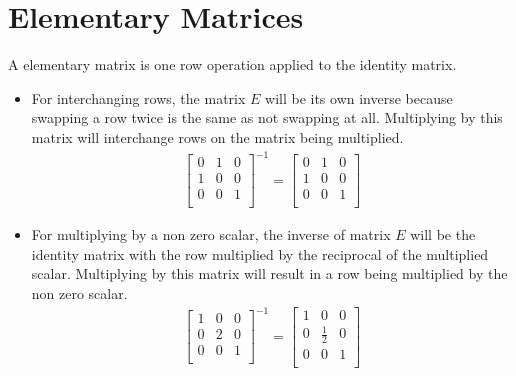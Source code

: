 \documentclass{article}
\theoremstyle{mytheoremstyle}
\theoremstyle{mytheoremstyle}
\theoremstyle{myproblemstyle}
\begin{document}
    \section*{Elementary Matrices}
    A elementary matrix is one row operation applied to the identity matrix.
    \begin{itemize}
        \item For interchanging rows, the matrix $E$ will be its own inverse
            because swapping a row twice is the same as not swapping at all.
            Multiplying by this matrix will interchange rows on the matrix being
            multiplied.
            \begin{align*}
                \begin{bmatrix}
                    0 & 1 & 0 \\
                    1 & 0 & 0 \\
                    0 & 0 & 1 \\
                \end{bmatrix}^{-1} = 
                \begin{bmatrix}
                    0 & 1 & 0 \\
                    1 & 0 & 0 \\
                    0 & 0 & 1 \\
                \end{bmatrix}
            \end{align*}

        \item For multiplying by a non zero scalar, the inverse of matrix $E$
            will be the identity matrix with the row multiplied by the
            reciprocal of the multiplied scalar. Multiplying by this matrix will
            result in a row being multiplied by the non zero scalar.
            \begin{align*}
                \begin{bmatrix}
                    1 & 0 & 0 \\
                    0 & 2 & 0 \\
                    0 & 0 & 1 \\
                \end{bmatrix}^{-1} = 
                \begin{bmatrix}
                    1 & 0 & 0 \\
                    0 & \frac{1}{2} & 0 \\
                    0 & 0 & 1 \\
                \end{bmatrix} \\
            \end{align*}


\end{itemize}
\end{document}

